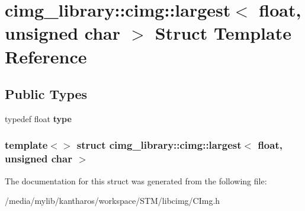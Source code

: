 \hypertarget{structcimg__library_1_1cimg_1_1largest_3_01float_00_01unsigned_01char_01_4}{
\section{cimg\_\-library::cimg::largest$<$ float, unsigned char $>$ Struct Template Reference}
\label{structcimg__library_1_1cimg_1_1largest_3_01float_00_01unsigned_01char_01_4}
}
\subsection*{Public Types}
\begin{DoxyCompactItemize}
\item 
\hypertarget{structcimg__library_1_1cimg_1_1largest_3_01float_00_01unsigned_01char_01_4_a3dc466d89f32e4b4904d68b00c3bcb58}{
typedef float {\bfseries type}}
\label{structcimg__library_1_1cimg_1_1largest_3_01float_00_01unsigned_01char_01_4_a3dc466d89f32e4b4904d68b00c3bcb58}

\end{DoxyCompactItemize}
\subsubsection*{template$<$$>$ struct cimg\_\-library::cimg::largest$<$ float, unsigned char $>$}



The documentation for this struct was generated from the following file:\begin{DoxyCompactItemize}
\item 
/media/mylib/kantharos/workspace/STM/libcimg/CImg.h\end{DoxyCompactItemize}
